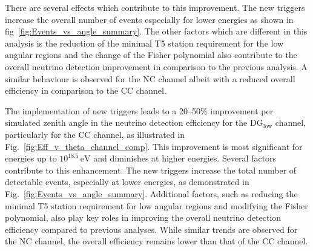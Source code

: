 There are several effects which contribute to this improvement. The new triggers increase the overall number of events especially for lower energies as shown in fig~\ref{fig:Events_vs_angle_summary}. The other factors which are different in this analysis is the reduction of the minimal T5 station requirement for the low angular regions and the change of the Fisher polynomial also contribute to the overall neutrino detection improvement in comparison to the previous analysis. A similar behaviour is observed for the NC channel albeit with a reduced overall efficiency in comparison to the CC channel. 

The implementation of new triggers leads to a 20--50\% improvement per simulated zenith angle in the neutrino detection efficiency for the DG$_{\mathrm{low}}$ channel, particularly for the CC channel, as illustrated in Fig.~\ref{fig:Eff_v_theta_channel_comp}. This improvement is most significant for energies up to \(10^{18.5}\,\mathrm{eV}\) and diminishes at higher energies. Several factors contribute to this enhancement. The new triggers increase the total number of detectable events, especially at lower energies, as demonstrated in Fig.~\ref{fig:Events_vs_angle_summary}. Additional factors, such as reducing the minimal T5 station requirement for low angular regions and modifying the Fisher polynomial, also play key roles in improving the overall neutrino detection efficiency compared to previous analyses. While similar trends are observed for the NC channel, the overall efficiency remains lower than that of the CC channel.










